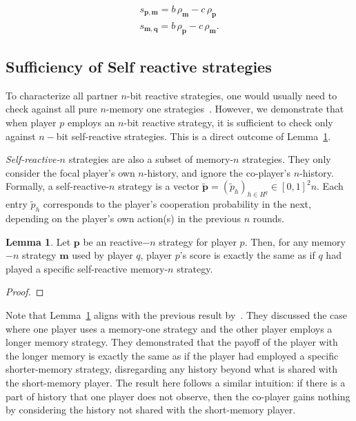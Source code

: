 \documentclass{article}
\theoremstyle{definition}
\newtheorem{lemma}[theorem]{Lemma}
\begin{document}
\begin{equation} \label{Eq:payoff}
  \begin{array}{lll}
  s_{\mathbf{p}, \mathbf{m}}  =  b\, \rho_\mathbf{m} - c\, \rho_\mathbf{p}\\
  s_{\mathbf{m}, \mathbf{q}} = b\, \rho_\mathbf{p} - c\, \rho_\mathbf{m}.
  \end{array}
\end{equation}


\subsection{Sufficiency of Self reactive strategies}

To characterize all partner $n$-bit reactive strategies, one would usually need
to check against all pure $n$-memory one strategies~\cite{mcavoy:PRSA:2019}.
However, we demonstrate that when player $p$ employs an $n$-bit reactive
strategy, it is sufficient to check only against $n-$bit self-reactive
strategies. This is a direct outcome of Lemma~\ref{lemma:self_reactive_sufficiency}.

{\it Self-reactive-$n$} strategies are also a subset of memory-$n$ strategies.
They only consider the focal player's own $n$-history, and ignore the co-player's
$n$-history. Formally, a self-reactive-$n$ strategy is a vector
$\mathbf{\tilde{p}} = (\tilde{p}_h)_{h \in H^q} \in [0, 1] ^ 2n$. Each entry
$\tilde{p}_h$ corresponds to the player's cooperation probability in the next,
depending on the player's own action(s) in the previous $n$ rounds.

\begin{lemma}\label{lemma:self_reactive_sufficiency}
  Let $\mathbf{p}$ be an reactive$-n$ strategy for player $p$. Then, for any
  memory$-n$ strategy $\mathbf{m}$ used by player $q$, player $p$'s score is
  exactly the same as if $q$ had played a specific self-reactive memory-$n$
  strategy.
\end{lemma}

\begin{proof}
\end{proof}

Note that Lemma~\ref{lemma:self_reactive_sufficiency} aligns with the previous
result by~\cite{press:PNAS:2012}. They discussed the case where one player uses
a memory-one strategy and the other player employs a longer memory strategy.
They demonstrated that the payoff of the player with the longer memory is
exactly the same as if the player had employed a specific shorter-memory
strategy, disregarding any history beyond what is shared with the short-memory
player. The result here follows a similar intuition: if there is a part of
history that one player does not observe, then the co-player gains nothing by
considering the history not shared with the short-memory player.
\end{document}
